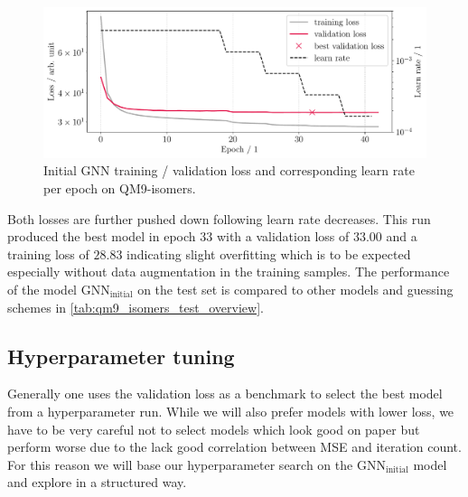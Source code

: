 \begin{figure}[H]
    \centering
    \includegraphics[width=\textwidth]{../fig/gnn/MGNN_6-31G_NO_AUG_07_07_manual_ref_train_val_loss.pdf}
    \caption[Initial GNN loss on QM9-isomers]{Initial GNN training / validation loss and corresponding learn rate per epoch on QM9-isomers.}
    \label{fig:initial_train_qm9_isomers}
\end{figure}
Both losses are further pushed down following learn rate decreases. This run produced the best model in epoch 33 with a validation loss of $33.00$ and a training loss of $28.83$ indicating slight overfitting which is to be expected especially without data augmentation in the training samples. The performance of the model $\text{GNN}_\text{initial}$ on the test set is compared to other models and guessing schemes in \autoref{tab:qm9_isomers_test_overview}. 



\subsection{Hyperparameter tuning}
\label{subsec:qm9_isomers_hyperparamtuning}
Generally one uses the validation loss as a benchmark to select the best model from a hyperparameter run. While we will also prefer models with lower loss, we have to be very careful not to select models which look good on paper but perform worse due to the lack good correlation between MSE and iteration count. For this reason we will base our hyperparameter search on the $\text{GNN}_\text{initial}$ model and explore in a structured way. 

